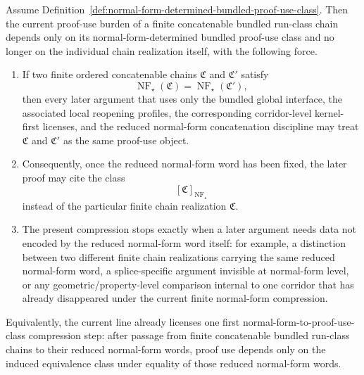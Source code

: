 \begin{proposition}
\label{prop:first-normal-form-to-proof-use-class-compression-principle}
Assume Definition~\ref{def:normal-form-determined-bundled-proof-use-class}. Then the current proof-use burden of a finite concatenable bundled run-class chain depends only on its normal-form-determined bundled proof-use class and no longer on the individual chain realization itself, with the following force.
\begin{enumerate}[leftmargin=2em,label=(\roman*)]
\item If two finite ordered concatenable chains \(\mathfrak C\) and \(\mathfrak C'\) satisfy
\[
\operatorname{NF}_{\star}(\mathfrak C)=\operatorname{NF}_{\star}(\mathfrak C'),
\]
then every later argument that uses only the bundled global interface, the associated local reopening profiles, the corresponding corridor-level kernel-first licenses, and the reduced normal-form concatenation discipline may treat \(\mathfrak C\) and \(\mathfrak C'\) as the same proof-use object.
\item Consequently, once the reduced normal-form word has been fixed, the later proof may cite the class
\[
[\mathfrak C]_{\operatorname{NF}_{\star}}
\]
instead of the particular finite chain realization \(\mathfrak C\).
\item The present compression stops exactly when a later argument needs data not encoded by the reduced normal-form word itself: for example, a distinction between two different finite chain realizations carrying the same reduced normal-form word, a splice-specific argument invisible at normal-form level, or any geometric/property-level comparison internal to one corridor that has already disappeared under the current finite normal-form compression.
\end{enumerate}
Equivalently, the current line already licenses one first normal-form-to-proof-use-class compression step: after passage from finite concatenable bundled run-class chains to their reduced normal-form words, proof use depends only on the induced equivalence class under equality of those reduced normal-form words.
\end{proposition}

